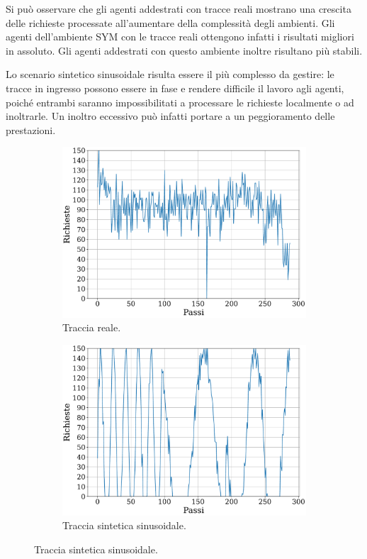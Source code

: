 \documentclass[a4paper, twocolumn]{article}
\begin{document}
Si può osservare che gli agenti addestrati con tracce reali mostrano una crescita delle richieste processate all'aumentare della complessità degli ambienti. Gli agenti dell'ambiente SYM con le tracce reali ottengono infatti i risultati migliori in assoluto. Gli agenti addestrati con questo ambiente inoltre risultano più stabili.

Lo scenario sintetico sinusoidale risulta essere il più complesso da gestire: le tracce in ingresso possono essere in fase e rendere difficile il lavoro agli agenti, poiché entrambi saranno impossibilitati a processare le richieste localmente o ad inoltrarle. Un inoltro eccessivo può infatti portare a un peggioramento delle prestazioni.

\begin{figure}
    \centering

    \begin{subfigure}{\columnwidth}
        \centering
        \includegraphics[width=\linewidth]{assets/5/requests_real_64425_single_agent.pdf}
        \caption{Traccia reale.}
    \end{subfigure}
    
    \begin{subfigure}{\columnwidth}
        \centering
        \includegraphics[width=\linewidth]{assets/5/requests_sinusoidal_64425_single_agent.pdf}
        \caption{Traccia sintetica sinusoidale.}
    \end{subfigure}
    

\end{figure}
\end{document}
